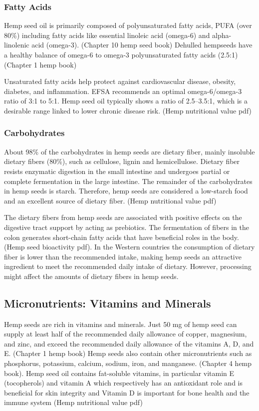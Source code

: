 \subsubsection{Fatty Acids}
Hemp seed oil is primarily composed of polyunsaturated fatty acids, PUFA (over 80\%) including fatty acids like essential linoleic acid (omega-6) and alpha-linolenic acid (omega-3). (Chapter 10 hemp seed book) Dehulled hempseeds have a healthy balance of omega-6 to omega-3 polyunsaturated fatty acids (2.5:1) (Chapter 1 hemp book)

\vspace{1em}
Unsaturated fatty acids help protect against cardiovascular disease, obesity, diabetes, and inflammation. EFSA recommends an optimal omega-6/omega-3 ratio of 3:1 to 5:1. Hemp seed oil typically shows a ratio of 2.5–3.5:1, which is a desirable range linked to lower chronic disease risk. (Hemp nutritional value pdf)

\subsubsection{Carbohydrates}
About 98\% of the carbohydrates in hemp seeds are dietary fiber, mainly insoluble dietary fibers (80\%), such as cellulose, lignin and hemicellulose. Dietary fiber resists enzymatic digestion in the small intestine and undergoes partial or complete fermentation in the large intestine. The remainder of the carbohydrates in hemp seeds is starch. Therefore, hemp seeds are considered a low-starch food and an excellent source of dietary fiber. (Hemp nutritional value pdf) 

\vspace{1em}
The dietary fibers from hemp seeds are associated with positive effects on the digestive tract support by acting as prebiotics. The fermentation of fibers in the colon generates short-chain fatty acids that have beneficial roles in the body. (Hemp seed bioactivity pdf). In the Western countries the consumption of dietary fiber is lower than the recommended intake, making hemp seeds an attractive ingredient to meet the recommended daily intake of dietary. However, processing might affect the amounts of dietary fibers in hemp seeds. 

\subsection{Micronutrients: Vitamins and Minerals}
Hemp seeds are rich in vitamins and minerals. Just 50 mg of hemp seed can supply at least half of the recommended daily allowance of copper, magnesium, and zinc, and exceed the recommended daily allowance of the vitamins A, D, and E. (Chapter 1 hemp book) Hemp seeds also contain other micronutrients such as phosphorus, potassium, calcium, sodium, iron, and manganese. (Chapter 4 hemp book). Hemp seed oil contains fat-soluble vitamins, in particular vitamin E (tocopherols) and vitamin A which respectively has an antioxidant role and is beneficial for skin integrity and Vitamin D is important for bone health and the immune system (Hemp nutritional value pdf)

